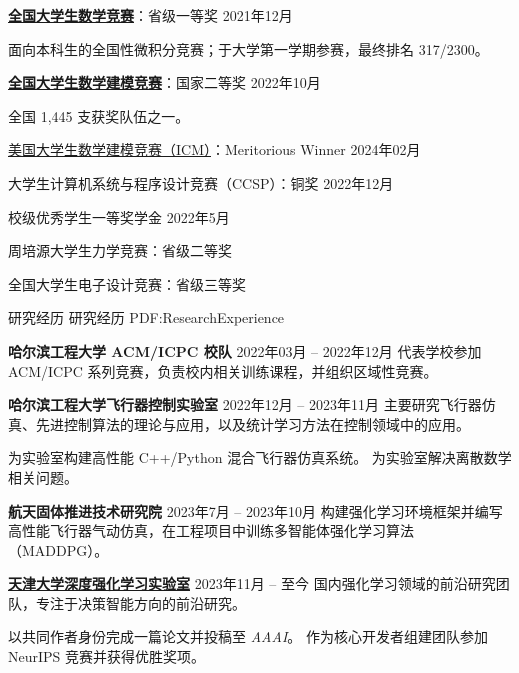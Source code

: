 \documentclass[letterpaper,MMMyyyy,nonstopmode]{simpleresumecv}
\renewcommand{\Gap}{\par\vspace{0.75mm}\par}
\renewcommand{\BigGap}{\par\vspace{2.8mm}\par}
\renewcommand{\DatestampYM}[2]{\mbox{#1年#2月}}
\begin{document}
\begin{Body}
\Gap
\BulletItem
\href{http://www.cmathc.cn/}{\textbf{全国大学生数学竞赛}}：省级一等奖
\hfill
\DatestampYM{2021}{12}
\begin{Detail}
\Item
面向本科生的全国性微积分竞赛；于大学第一学期参赛，最终排名 317/2300。
\end{Detail}

\Gap
\BulletItem
\href{https://www.mcm.edu.cn/html_cn/node/5b6ed02462b2ea3d79206e445af3433a.html}{\textbf{全国大学生数学建模竞赛}}：国家二等奖
\hfill
\DatestampYM{2022}{10}
\begin{Detail}
\Item
全国 1,445 支获奖队伍之一。
\end{Detail}

\Gap
\BulletItem
\href{https://www.comap.com}{美国大学生数学建模竞赛（ICM）}：Meritorious Winner
\hfill
\DatestampYM{2024}{02}

\Gap
\BulletItem
大学生计算机系统与程序设计竞赛（CCSP）：铜奖
\hfill
\DatestampYM{2022}{12}

\Gap
\BulletItem
校级优秀学生一等奖学金
\hfill
\DatestampYM{2022}{5}

\Gap
\BulletItem
周培源大学生力学竞赛：省级二等奖

\Gap
\BulletItem
全国大学生电子设计竞赛：省级三等奖


\Section
{研究经历}
{研究经历}
{PDF:ResearchExperience}

\Entry
\textbf{哈尔滨工程大学 ACM/ICPC 校队}
\hfill
\DatestampYM{2022}{03} --
\DatestampYM{2022}{12}
\newline
代表学校参加 ACM/ICPC 系列竞赛，负责校内相关训练课程，并组织区域性竞赛。

\BigGap
\textbf{哈尔滨工程大学飞行器控制实验室}
\hfill
\DatestampYM{2022}{12} --
\DatestampYM{2023}{11}
\newline
主要研究飞行器仿真、先进控制算法的理论与应用，以及统计学习方法在控制领域中的应用。
\begin{Detail}
\BulletItem
为实验室构建高性能 C++/Python 混合飞行器仿真系统。
\BulletItem
为实验室解决离散数学相关问题。
\end{Detail}

\BigGap
\textbf{航天固体推进技术研究院}
\hfill
\DatestampYM{2023}{7} --
\DatestampYM{2023}{10}
\newline
构建强化学习环境框架并编写高性能飞行器气动仿真，在工程项目中训练多智能体强化学习算法（MADDPG）。

\BigGap
\href{http://rl.beiyang.ren/}{\textbf{天津大学深度强化学习实验室}}
\hfill
\DatestampYM{2023}{11} -- 至今
\newline
国内强化学习领域的前沿研究团队，专注于决策智能方向的前沿研究。
\begin{Detail}
\BulletItem
以共同作者身份完成一篇论文并投稿至 \textit{AAAI}。
\BulletItem
作为核心开发者组建团队参加 NeurIPS 竞赛并获得优胜奖项。
\end{Detail}


\end{Body}
\end{document}
